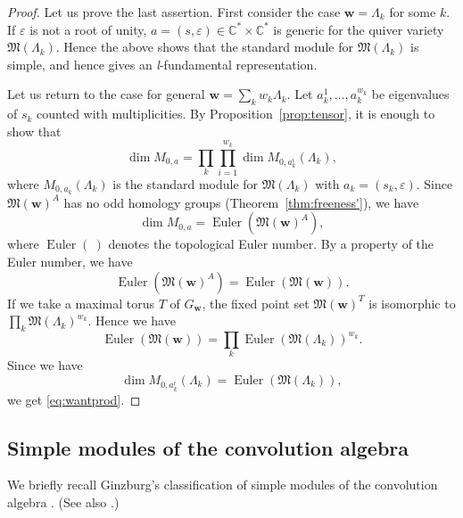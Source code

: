 \documentclass[12pt]{amsart}
\def\Bbb{\mathbb}
\def\frak{\mathfrak}
\theoremstyle{definition}
\theoremstyle{remark}
\numberwithin{equation}{subsection}
\newcommand{\thmref}[1]{Theorem~\ref{#1}}
\newcommand{\propref}[1]{Proposition~\ref{#1}}
\newcommand{\C}{{\Bbb C}}
\newcommand{\M}{{\frak M}} %
\newcommand{\bw}{{\mathbf w}} %
\newcommand{\Mw}{\M(\bw)}
\begin{document}
\begin{proof}
Let us prove the last assertion. First consider the case $\bw =
\Lambda_k$ for some $k$. If $\varepsilon$ is not a root of
unity, $a = (s,\varepsilon)\in\C^*\times\C^*$ is generic for the
quiver variety $\M(\Lambda_k)$. Hence the above shows that the
standard module for $\M(\Lambda_k)$ is simple, and hence gives an
{\it l\/}-fundamental representation.

Let us return to the case for general $\bw = \sum_k w_k \Lambda_k$.
Let $a_k^{1},\dots, a_k^{w_k}$ be eigenvalues of $s_k$ counted with
multiplicities.
By \propref{prop:tensor}, it is enough to show that
\begin{equation}\label{eq:wantprod}
  \dim M_{0,a} = \prod_k \prod_{i=1}^{w_k} \dim M_{0,a_k^i}(\Lambda_k), 
\end{equation}
where $M_{0,a_k}(\Lambda_k)$ is the standard module for
$\M(\Lambda_k)$ with $a_k = (s_k,\varepsilon)$.
%
Since $\Mw^A$ has no odd homology
groups (\thmref{thm:freeness'}), we have
\begin{equation*}
   \dim M_{0,a} = \operatorname{Euler}(\Mw^A),
\end{equation*}
where $\operatorname{Euler}(\ )$ denotes the topological Euler
number. By a property of the Euler number, we have
\begin{equation*}
    \operatorname{Euler}(\Mw^A) =  \operatorname{Euler}(\Mw).
\end{equation*}
If we take a maximal torus $T$ of $G_\bw$, the fixed point set
$\Mw^T$ is isomorphic to
\(
   \prod_k \M(\Lambda_k)^{w_k}.   
\)
Hence we have
\begin{equation*}
    \operatorname{Euler}(\Mw) = \prod_k
    \operatorname{Euler}(\M(\Lambda_k))^{w_k}.
\end{equation*}
Since we have
\begin{equation*}
   \dim M_{0,a_k^i}(\Lambda_k) = \operatorname{Euler}(\M(\Lambda_k)),
\end{equation*}
we get \eqref{eq:wantprod}.
\end{proof}

\subsection{Simple modules of the convolution algebra}\label{subsec:Ginzburg}

We briefly recall Ginzburg's classification of simple modules of
the convolution algebra \cite[\S8.6]{Gi-book}. (See also
\cite{Lu-cusp}.)
\end{document}
